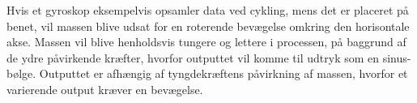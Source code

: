  Hvis et gyroskop eksempelvis opsamler data ved cykling, mens det er placeret på benet, vil massen blive udsat for en roterende bevægelse omkring den horisontale akse. Massen vil blive henholdsvis tungere og lettere i processen, på baggrund af de ydre påvirkende kræfter, hvorfor outputtet vil komme til udtryk som en sinus-bølge. Outputtet er afhængig af tyngdekræftens påvirkning af massen, hvorfor et varierende output kræver en bevægelse. \citep{TittertonWeston2004,LuingeVeltink2005}
%

